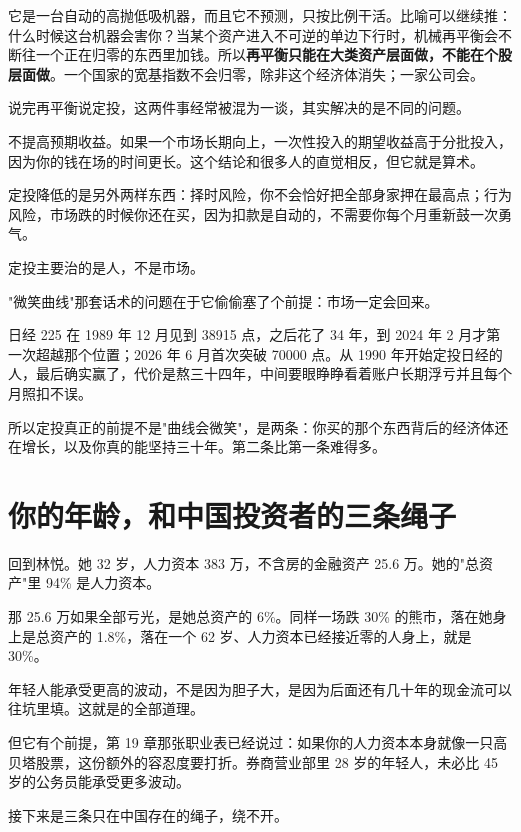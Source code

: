 它是一台自动的高抛低吸机器，而且它不预测，只按比例干活。比喻可以继续推：什么时候这台机器会害你？当某个资产进入不可逆的单边下行时，机械再平衡会不断往一个正在归零的东西里加钱。所以\textbf{再平衡只能在大类资产层面做，不能在个股层面做}。一个国家的宽基指数不会归零，除非这个经济体消失；一家公司会。

说完再平衡说定投，这两件事经常被混为一谈，其实解决的是不同的问题。

不提高预期收益。如果一个市场长期向上，一次性投入的期望收益高于分批投入，因为你的钱在场的时间更长。这个结论和很多人的直觉相反，但它就是算术。

定投降低的是另外两样东西：择时风险，你不会恰好把全部身家押在最高点；行为风险，市场跌的时候你还在买，因为扣款是自动的，不需要你每个月重新鼓一次勇气。

\begin{pullquote}{}
定投主要治的是人，不是市场。
\end{pullquote}

"微笑曲线"那套话术的问题在于它偷偷塞了个前提：市场一定会回来。

日经 225 在 1989 年 12 月见到 38915 点，之后花了 34 年，到 2024 年 2 月才第一次超越那个位置；2026 年 6 月首次突破 70000 点。从 1990 年开始定投日经的人，最后确实赢了，代价是熬三十四年，中间要眼睁睁看着账户长期浮亏并且每个月照扣不误。

所以定投真正的前提不是"曲线会微笑"，是两条：你买的那个东西背后的经济体还在增长，以及你真的能坚持三十年。第二条比第一条难得多。

\section{你的年龄，和中国投资者的三条绳子}

回到林悦。她 32 岁，人力资本 383 万，不含房的金融资产 25.6 万。她的"总资产"里 94\% 是人力资本。

那 25.6 万如果全部亏光，是她总资产的 6\%。同样一场跌 30\% 的熊市，落在她身上是总资产的 1.8\%，落在一个 62 岁、人力资本已经接近零的人身上，就是 30\%。

年轻人能承受更高的波动，不是因为胆子大，是因为后面还有几十年的现金流可以往坑里填。这就是的全部道理。

但它有个前提，第 19 章那张职业表已经说过：如果你的人力资本本身就像一只高贝塔股票，这份额外的容忍度要打折。券商营业部里 28 岁的年轻人，未必比 45 岁的公务员能承受更多波动。

接下来是三条只在中国存在的绳子，绕不开。

